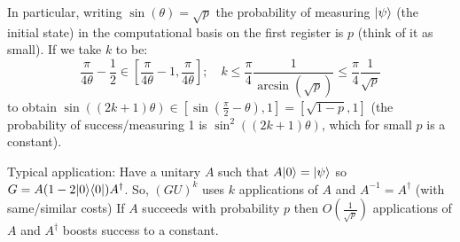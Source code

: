 In particular, writing $\sin(\theta) = \sqrt{p}$ the probability of measuring $\lvert \psi \rangle$ (the initial state) in the computational basis on the first register is $p$ (think of it as small). If we take $k$ to be:
\begin{equation}
    \frac{\pi}{4\theta} - \frac{1}{2} \in [\frac{\pi}{4\theta} - 1, \frac{\pi}{4\theta}]; \quad k \leq \frac{\pi}{4}\frac{1}{\arcsin(\sqrt{p})} \leq \frac{\pi}{4}\frac{1}{\sqrt{p}}
\end{equation}
to obtain $\sin((2k+1)\theta) \in [\sin(\frac{\pi}{2}-\theta),1] = [\sqrt{1-p}, 1]$ (the probability of success/measuring 1 is $\sin^2((2k+1)\theta)$, which for small $p$ is a constant). 

Typical application: Have a unitary $A$ such that $A\lvert 0 \rangle = \lvert \psi \rangle$ so $G = A(1 - 2\lvert 0 \rangle \langle 0 \rvert)A^\dagger$. So, $(GU)^k$ uses $k$ applications of $A$ and $A^{-1} = A^\dag$ (with same/similar costs) If $A$ succeeds with probability $p$ then $O(\frac{1}{\sqrt{p}})$ applications of $A$ and $A^\dag$ boosts success to a constant.